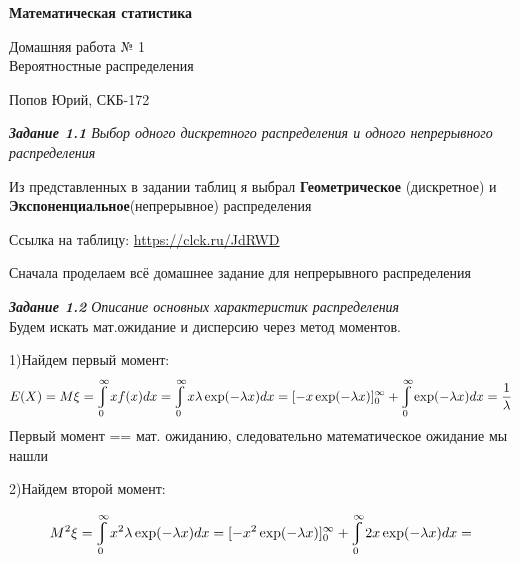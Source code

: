 \documentclass[a4paper,12pt, oneside]{article}
\let\int\varint
\begin{document}
	
	
	
	\begin{center}
		{\Huge \textbf{Математическая статистика}}
		\vspace{\baselineskip}
		
		{\huge Домашняя работа № 1 \\}
		\vspace{\baselineskip}
		{\huge Вероятностные распределения}
		\vspace{\baselineskip}
		
		{\large Попов Юрий, СКБ-172}
	\end{center}



\vspace{13mm}%
\textit{\textbf{Задание 1.1} Выбор одного дискретного распределения
	и одного непрерывного распределения}
\vspace{13mm}

Из представленных в задании таблиц я выбрал \textbf{Геометрическое} (дискретное) и \textbf{Экспоненциальное}(непрерывное) распределения

\vspace{\baselineskip}

Ссылка на  таблицу: \url{https://clck.ru/JdRWD}

	\vspace{\baselineskip}
{\large Сначала проделаем всё домашнее задание для непрерывного распределения}

\vspace{13mm}%
\textit{\textbf{Задание 1.2} Описание основных характеристик распределения}
\vspace{13mm}
\\
	Будем искать мат.ожидание и дисперсию через метод моментов.
	
	\vspace{\baselineskip}
	1)Найдем первый момент:
	$$
	E(X) = M\xi = \int_0^\infty x f(x) dx = \int_0^\infty x \lambda \exp(-\lambda x)dx = [- x \exp(- \lambda x)]_0^\infty + \int_0^\infty \exp(-\lambda x) dx = \frac{1}{\lambda}
	$$
	Первый момент == мат. ожиданию, следовательно математическое ожидание мы нашли
	
	\vspace{\baselineskip}
	2)Найдем второй момент:
	
	$$
	M^2\xi = \int_0^\infty x^2 \lambda \exp(-\lambda x) dx = [-x^2 \exp(-\lambda x)]_0^\infty +\int_0^\infty 2 x \exp(-\lambda x)dx =
	$$ 
	
\end{document}
